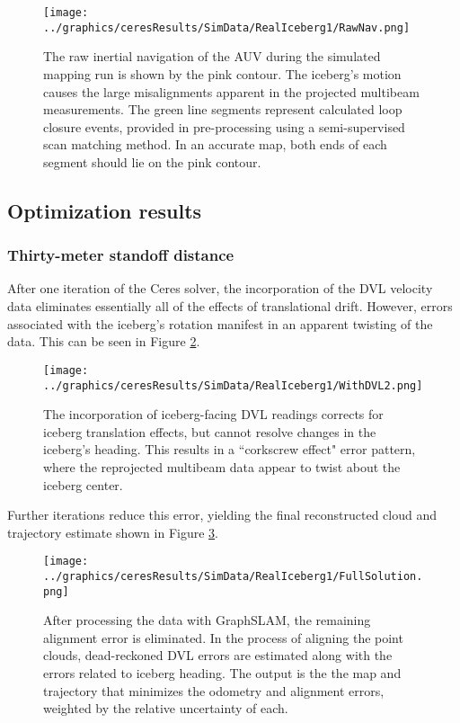  \begin{figure}[!htb]
   \centering
   \texttt{[image: ../graphics/ceresResults/SimData/RealIceberg1/RawNav.png]} %
   \caption{The raw inertial navigation of the AUV during the simulated mapping run is shown by the pink contour. The iceberg's motion causes the large misalignments apparent in the projected multibeam measurements. The green line segments represent calculated loop closure events, provided in pre-processing using a semi-supervised scan matching method. In an accurate map, both ends of each segment should lie on the pink contour.}
   \label{fig:RawNav}
\end{figure}

\subsection{Optimization results}

\subsubsection{Thirty-meter standoff distance}

After one iteration of the Ceres solver, the incorporation of the DVL velocity data eliminates essentially all of the effects of translational drift.  However, errors associated with the iceberg's rotation manifest in an apparent twisting of the data. This can be seen in Figure \ref{fig:WithDVL1}.

\begin{figure}[!htb]
   \centering
   \texttt{[image: ../graphics/ceresResults/SimData/RealIceberg1/WithDVL2.png]} %
   \caption{The incorporation of iceberg-facing DVL readings corrects for iceberg translation effects, but cannot resolve changes in the iceberg's heading. This results in a ``corkscrew effect" error pattern, where the reprojected multibeam data appear to twist about the iceberg center.}
   \label{fig:WithDVL1}
\end{figure}

Further iterations reduce this error, yielding the final reconstructed cloud and trajectory estimate shown in Figure \ref{fig:FullSimSol}.

 \begin{figure}[!htb]
   \centering
   \texttt{[image: ../graphics/ceresResults/SimData/RealIceberg1/FullSolution.png]} %
   \caption{After processing the data with GraphSLAM, the remaining alignment error is eliminated. In the process of aligning the point clouds, dead-reckoned DVL errors are estimated along with the errors related to iceberg heading. The output is the the map and trajectory that minimizes the odometry and alignment errors, weighted by the relative uncertainty of each. }
   \label{fig:FullSimSol}
\end{figure}

